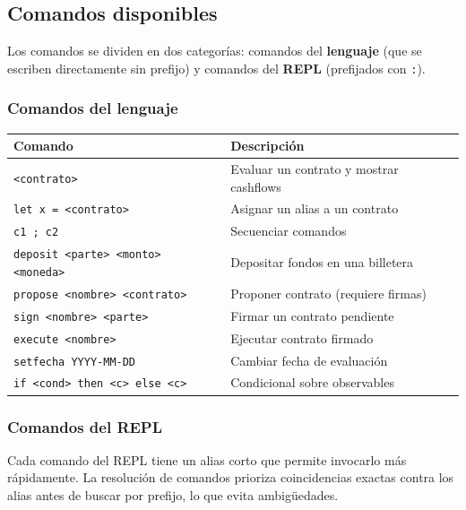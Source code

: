 \documentclass[a4paper, 12pt]{article}
\begin{document}
\subsection{Comandos disponibles}

Los comandos se dividen en dos categorías: comandos del \textbf{lenguaje} (que se escriben directamente sin prefijo) y comandos del \textbf{REPL} (prefijados con \texttt{:}).

\subsubsection{Comandos del lenguaje}

\begin{center}
\begin{tabular}{l l}
\toprule
\textbf{Comando} & \textbf{Descripción} \\
\midrule
\texttt{<contrato>} & Evaluar un contrato y mostrar cashflows \\
\texttt{let x = <contrato>} & Asignar un alias a un contrato \\
\texttt{c1 ; c2} & Secuenciar comandos \\
\texttt{deposit <parte> <monto> <moneda>} & Depositar fondos en una billetera \\
\texttt{propose <nombre> <contrato>} & Proponer contrato (requiere firmas) \\
\texttt{sign <nombre> <parte>} & Firmar un contrato pendiente \\
\texttt{execute <nombre>} & Ejecutar contrato firmado \\
\texttt{setfecha YYYY-MM-DD} & Cambiar fecha de evaluación \\
\texttt{if <cond> then <c> else <c>} & Condicional sobre observables \\
\bottomrule
\end{tabular}
\end{center}

\subsubsection{Comandos del REPL}

Cada comando del REPL tiene un alias corto que permite invocarlo más rápidamente. La resolución de comandos prioriza coincidencias exactas contra los alias antes de buscar por prefijo, lo que evita ambigüedades.
\end{document}
